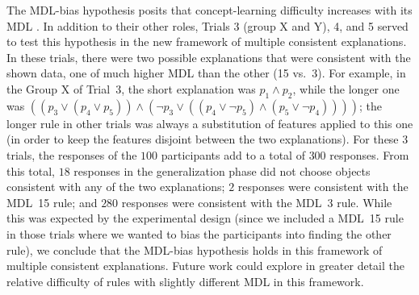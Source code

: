 The MDL-bias hypothesis posits that concept-learning difficulty increases with its MDL \cite{feldman2000minimization}. %
In addition to their other roles, Trials 3 (group X and Y), 4, and 5 served to test this hypothesis in the new framework of multiple consistent explanations. In these trials, there were two possible explanations that were consistent with the shown data, one of much higher MDL than the other (15 vs.\ 3). For example, in the Group X of Trial~3, the short explanation was $p_1 \land p_2$, while the longer one was $((p_3 \lor (p_4 \lor p_5))\land(\lnot p_3 \lor ((p_4 \lor \lnot p_5)\land (p_5 \lor \lnot p_4))))$; the longer rule in other trials was always a substitution of features applied to this one (in order to keep the features disjoint between the two explanations). For these 3 trials, the responses of the $100$ participants add to a total of $300$ responses. From this total, $18$ responses in the generalization phase did not choose objects consistent with any of the two explanations; $2$ responses were consistent with the MDL~15 rule; and $280$ responses were consistent with the MDL~3 rule. While this was expected by the experimental design (since we included a MDL~15 rule in those trials where we wanted to bias the participants into finding the other rule), we conclude that the MDL-bias hypothesis holds in this framework of multiple consistent explanations. Future work could explore in greater detail the relative difficulty of rules with slightly different MDL in this framework.
